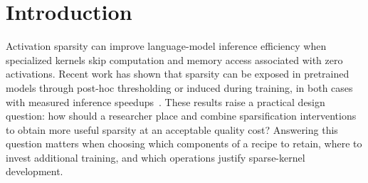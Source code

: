 \section{Introduction}
\label{sec:introduction}


Activation sparsity can improve language-model inference efficiency when specialized kernels skip computation and memory access associated with zero activations. Recent work has shown that sparsity can be exposed in pretrained models through post-hoc thresholding or induced during training, in both cases with measured inference speedups~\citep{liu2024teal,cetin2026sparser}. These results raise a practical design question: how should a researcher place and combine sparsification interventions to obtain more useful sparsity at an acceptable quality cost? Answering this question matters when choosing which components of a recipe to retain, where to invest additional training, and which operations justify sparse-kernel development.



